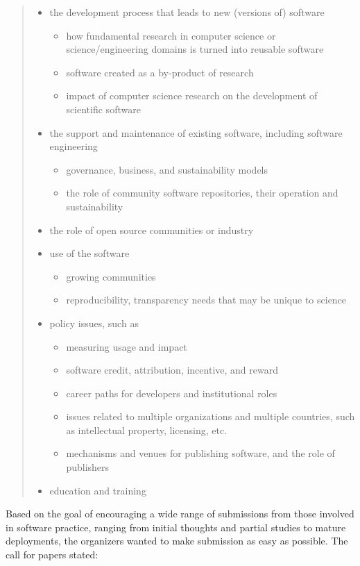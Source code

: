 \documentclass[11pt, oneside]{amsart}
\begin{document}
\begin{quote}
\begin{itemize}
\item the development process that leads to new (versions of) software
\begin{itemize}
\item how fundamental research in computer science or
  science/engineering domains is turned into reusable software
\item software created as a by-product of research
\item impact of computer science research on the development of
  scientific software
\end{itemize}
\item the support and maintenance of existing software, including
  software engineering
\begin{itemize}
\item governance, business, and sustainability models
\item the role of community software repositories, their operation and
  sustainability
\end{itemize}
\item the role of open source communities or industry
\item use of the software
\begin{itemize}
\item growing communities
\item reproducibility, transparency needs that may be unique to science
\end{itemize}
\item policy issues, such as
\begin{itemize}
\item measuring usage and impact
\item software credit, attribution, incentive, and reward
\item career paths for developers and institutional roles
\item issues related to multiple organizations and multiple countries,
  such as intellectual property, licensing, etc.
\item mechanisms and venues for publishing software, and the role of
  publishers
\end{itemize}
\item education and training
\end{itemize}

\end{quote}

Based on the goal of encouraging a wide range of submissions from
those involved in software practice, ranging from initial thoughts and
partial studies to mature deployments, the organizers wanted to make
submission as easy as possible. The call for papers stated:
\end{document}
